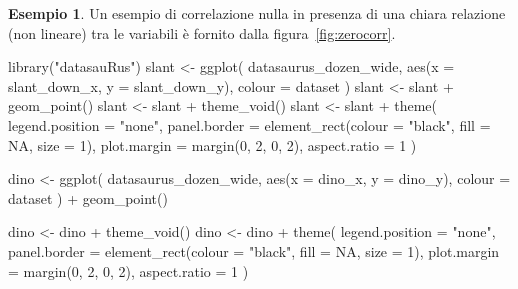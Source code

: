 \documentclass[
  10pt,
  italian,
  a4paper,
  extrafontsizes,onecolumn,openright
  ]{memoir}
\newenvironment{Shaded}{\begin{snugshade}}{\end{snugshade}}
\newcommand{\AttributeTok}[1]{\textcolor[rgb]{0.77,0.63,0.00}{#1}}
\newcommand{\ConstantTok}[1]{\textcolor[rgb]{0.00,0.00,0.00}{#1}}
\newcommand{\DecValTok}[1]{\textcolor[rgb]{0.00,0.00,0.81}{#1}}
\newcommand{\FunctionTok}[1]{\textcolor[rgb]{0.00,0.00,0.00}{#1}}
\newcommand{\NormalTok}[1]{#1}
\newcommand{\OtherTok}[1]{\textcolor[rgb]{0.56,0.35,0.01}{#1}}
\newcommand{\SpecialCharTok}[1]{\textcolor[rgb]{0.00,0.00,0.00}{#1}}
\newcommand{\StringTok}[1]{\textcolor[rgb]{0.31,0.60,0.02}{#1}}
\theoremstyle{definition}
\theoremstyle{definition}
\newtheorem{example}{Esempio}[chapter]
\theoremstyle{definition}
\theoremstyle{definition}
\theoremstyle{remark}
\begin{document}
\begin{example}

Un esempio di correlazione nulla in presenza di una chiara relazione (non lineare) tra le variabili è fornito dalla figura~\ref{fig:zerocorr}.

\begin{Shaded}
\begin{Highlighting}[]
\FunctionTok{library}\NormalTok{(}\StringTok{"datasauRus"}\NormalTok{)}
\NormalTok{slant }\OtherTok{\textless{}{-}} \FunctionTok{ggplot}\NormalTok{(}
\NormalTok{  datasaurus\_dozen\_wide,}
  \FunctionTok{aes}\NormalTok{(}\AttributeTok{x =}\NormalTok{ slant\_down\_x, }\AttributeTok{y =}\NormalTok{ slant\_down\_y),}
  \AttributeTok{colour =}\NormalTok{ dataset}
\NormalTok{)}
\NormalTok{slant }\OtherTok{\textless{}{-}}\NormalTok{ slant }\SpecialCharTok{+}
  \FunctionTok{geom\_point}\NormalTok{()}
\NormalTok{slant }\OtherTok{\textless{}{-}}\NormalTok{ slant }\SpecialCharTok{+}
  \FunctionTok{theme\_void}\NormalTok{()}
\NormalTok{slant }\OtherTok{\textless{}{-}}\NormalTok{ slant }\SpecialCharTok{+}
  \FunctionTok{theme}\NormalTok{(}
    \AttributeTok{legend.position =} \StringTok{"none"}\NormalTok{,}
    \AttributeTok{panel.border =} \FunctionTok{element\_rect}\NormalTok{(}\AttributeTok{colour =} \StringTok{"black"}\NormalTok{, }\AttributeTok{fill =} \ConstantTok{NA}\NormalTok{, }\AttributeTok{size =} \DecValTok{1}\NormalTok{),}
    \AttributeTok{plot.margin =} \FunctionTok{margin}\NormalTok{(}\DecValTok{0}\NormalTok{, }\DecValTok{2}\NormalTok{, }\DecValTok{0}\NormalTok{, }\DecValTok{2}\NormalTok{), }\AttributeTok{aspect.ratio =} \DecValTok{1}
\NormalTok{  )}

\NormalTok{dino }\OtherTok{\textless{}{-}} \FunctionTok{ggplot}\NormalTok{(}
\NormalTok{  datasaurus\_dozen\_wide,}
  \FunctionTok{aes}\NormalTok{(}\AttributeTok{x =}\NormalTok{ dino\_x, }\AttributeTok{y =}\NormalTok{ dino\_y),}
  \AttributeTok{colour =}\NormalTok{ dataset}
\NormalTok{) }\SpecialCharTok{+}
  \FunctionTok{geom\_point}\NormalTok{()}

\NormalTok{dino }\OtherTok{\textless{}{-}}\NormalTok{ dino }\SpecialCharTok{+}
  \FunctionTok{theme\_void}\NormalTok{()}
\NormalTok{dino }\OtherTok{\textless{}{-}}\NormalTok{ dino }\SpecialCharTok{+}
  \FunctionTok{theme}\NormalTok{(}
    \AttributeTok{legend.position =} \StringTok{"none"}\NormalTok{,}
    \AttributeTok{panel.border =} \FunctionTok{element\_rect}\NormalTok{(}\AttributeTok{colour =} \StringTok{"black"}\NormalTok{, }\AttributeTok{fill =} \ConstantTok{NA}\NormalTok{, }\AttributeTok{size =} \DecValTok{1}\NormalTok{),}
    \AttributeTok{plot.margin =} \FunctionTok{margin}\NormalTok{(}\DecValTok{0}\NormalTok{, }\DecValTok{2}\NormalTok{, }\DecValTok{0}\NormalTok{, }\DecValTok{2}\NormalTok{), }\AttributeTok{aspect.ratio =} \DecValTok{1}
\NormalTok{  )}


\end{Highlighting}
\end{Shaded}
\end{example}
\end{document}

